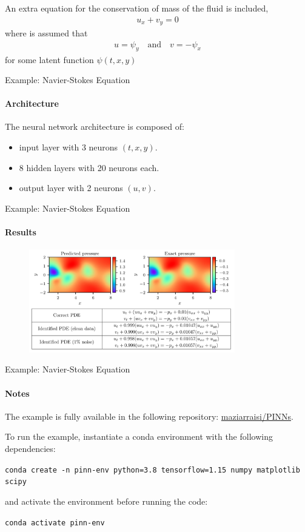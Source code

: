 \begin{frame}
An extra equation for the conservation of mass of the fluid is included, 
\begin{align}
    u_x + v_y = 0
\end{align}
where is assumed that
\begin{align}
u = \psi_y \quad \text{and} \quad v = -\psi_x
\end{align}
for some latent function $\psi(t, x, y)$
\end{frame}

\begin{frame}{Example: Navier-Stokes Equation}
\framesubtitle{Architecture}
The neural network architecture is composed of:
\begin{itemize}
    \item input layer with 3 neurons $(t, x, y)$.
    \item 8 hidden layers with 20 neurons each.
    \item output layer with 2 neurons $(u, v)$.
\end{itemize}
\end{frame}

\begin{frame}{Example: Navier-Stokes Equation}
\framesubtitle{Results}
\begin{figure}[H]
    \centering
    \includegraphics[width=0.8\textwidth]{img/navier-results.png}
\end{figure}
\end{frame}

\begin{frame}{Example: Navier-Stokes Equation}
\framesubtitle{Notes}
The example is fully available in the following repository:
\href{https://github.com/maziarraissi/PINNs}{maziarraisi/PINNs}.

To run the example, instantiate a conda environment with the following dependencies:

\texttt{conda create -n pinn-env python=3.8 tensorflow=1.15 numpy matplotlib scipy}

and activate the environment before running the code:

\texttt{conda activate pinn-env}

\end{frame}